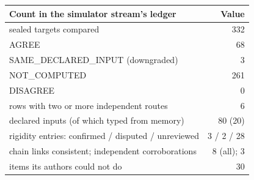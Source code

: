 \begin{tabular}{lr}
\toprule
Count in the simulator stream's ledger & Value \\
\midrule
sealed targets compared & 332 \\
\quad AGREE & 68 \\
\quad SAME\_DECLARED\_INPUT (downgraded) & 3 \\
\quad NOT\_COMPUTED & 261 \\
\quad DISAGREE & 0 \\
rows with two or more independent routes & 6 \\
declared inputs (of which typed from memory) & 80 (20) \\
rigidity entries: confirmed / disputed / unreviewed & 3 / 2 / 28 \\
chain links consistent; independent corroborations & 8 (all); 3 \\
items its authors could not do & 30 \\
\bottomrule
\end{tabular}
